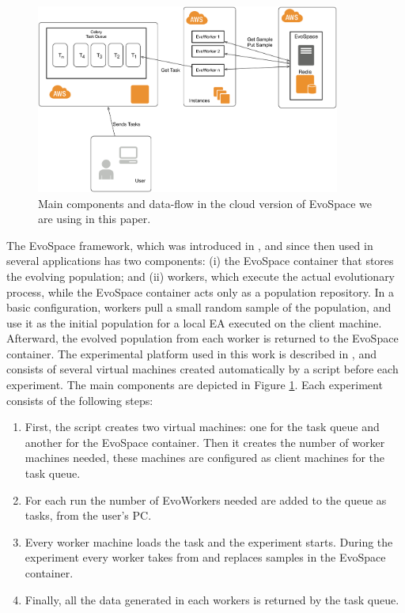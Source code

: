 \documentclass[conference]{IEEEtran}
\begin{document}
\begin{figure}[h!tbp]
    \centering
        \includegraphics[width=10cm]{img/EvoSpaceAWS.png}
    \caption{Main components and data-flow in the cloud version of EvoSpace we are using in this paper.}
    \label{fig:evospace}
  \end{figure}
The EvoSpace framework, which was introduced in \cite{Evospace}, and
since then used in several applications \cite{GValdez2015} has two components: (i) the EvoSpace
container that stores the evolving population; and (ii) workers, which execute
the actual evolutionary process, while the EvoSpace container acts only as a population repository.
In a basic configuration, workers pull a small random sample of the
population, and use it as the initial population for a local EA executed
on the client machine. Afterward, the evolved population from each worker
is returned to the EvoSpace container. The experimental platform used in this work is
described in \cite{valenzuela2015implementing}, and consists of several virtual machines
created automatically by a script before each experiment. The main components are depicted
in Figure \ref{fig:evospace}. Each experiment consists of the following steps:

\begin{enumerate}
    \item First, the script creates two virtual machines: one for the task queue and another
    for the EvoSpace container. Then it creates the number of worker machines needed, these
    machines are configured as client machines for the task queue.
    \item For each run the number of EvoWorkers needed are added to the queue as tasks, from
    the user's PC.
    \item Every worker machine loads the task and the experiment
      starts. During the experiment every worker takes from and replaces
      samples in the EvoSpace container.
    \item Finally, all the data generated in each workers is returned by the task queue.
    \end{enumerate}
\end{document}
